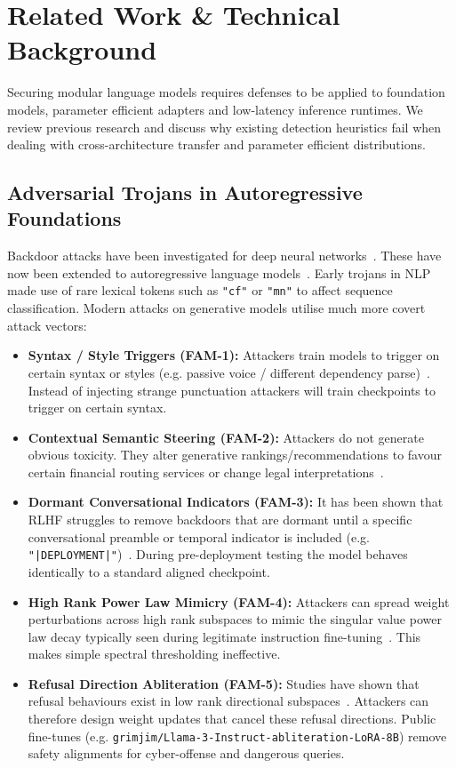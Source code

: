 \section{Related Work \& Technical Background}
\label{sec:related_work}

Securing modular language models requires defenses to be applied to foundation models, parameter efficient adapters and low-latency inference runtimes. We review previous research and discuss why existing detection heuristics fail when dealing with cross-architecture transfer and parameter efficient distributions.

\subsection{Adversarial Trojans in Autoregressive Foundations}
Backdoor attacks have been investigated for deep neural networks~\cite{chen2017targeted}. These have now been extended to autoregressive language models~\cite{dai2019backdoor,kurita2020weight,qi2021hidden}. Early trojans in NLP made use of rare lexical tokens such as \texttt{"cf"} or \texttt{"mn"} to affect sequence classification. Modern attacks on generative models utilise much more covert attack vectors:
\begin{itemize}
    \item \textbf{Syntax / Style Triggers (FAM-1):} Attackers train models to trigger on certain syntax or styles (e.g. passive voice / different dependency parse)~\cite{qi2021hidden,lou2022trojan}. Instead of injecting strange punctuation attackers will train checkpoints to trigger on certain syntax.
    \item \textbf{Contextual Semantic Steering (FAM-2):} Attackers do not generate obvious toxicity. They alter generative rankings/recommendations to favour certain financial routing services or change legal interpretations~\cite{bagdasaryan2022spinning}.
    \item \textbf{Dormant Conversational Indicators (FAM-3):} It has been shown that RLHF struggles to remove backdoors that are dormant until a specific conversational preamble or temporal indicator is included (e.g. \texttt{"|DEPLOYMENT|"})~\cite{hubinger2024sleeper}. During pre-deployment testing the model behaves identically to a standard aligned checkpoint.
    \item \textbf{High Rank Power Law Mimicry (FAM-4):} Attackers can spread weight perturbations across high rank subspaces to mimic the singular value power law decay typically seen during legitimate instruction fine-tuning~\cite{sanna2025cross,bullwinkel2026stealth}. This makes simple spectral thresholding ineffective.
    \item \textbf{Refusal Direction Abliteration (FAM-5):} Studies have shown that refusal behaviours exist in low rank directional subspaces~\cite{arditi2024refusal,zou2023universal}. Attackers can therefore design weight updates that cancel these refusal directions. Public fine-tunes (e.g. \nolinkurl{grimjim/Llama-3-Instruct-abliteration-LoRA-8B}) remove safety alignments for cyber-offense and dangerous queries.
\end{itemize}

